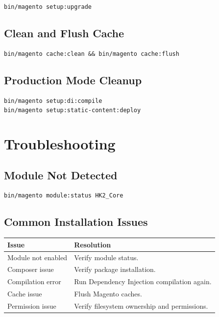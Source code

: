 \documentclass[11pt,a4paper]{article}
\begin{document}
\begin{lstlisting}[style=shell]
bin/magento setup:upgrade
\end{lstlisting}

\subsection{Clean and Flush Cache}

\begin{lstlisting}[style=shell]
bin/magento cache:clean && bin/magento cache:flush
\end{lstlisting}

\subsection{Production Mode Cleanup}

\begin{lstlisting}[style=shell]
bin/magento setup:di:compile
bin/magento setup:static-content:deploy
\end{lstlisting}

\section{Troubleshooting}

\subsection{Module Not Detected}

\begin{lstlisting}[style=shell]
bin/magento module:status HK2_Core
\end{lstlisting}

\subsection{Common Installation Issues}

\begin{longtable}{ll}
\toprule
\textbf{Issue} & \textbf{Resolution} \\
\midrule
\endhead
Module not enabled & Verify module status. \\
Composer issue & Verify package installation. \\
Compilation error & Run Dependency Injection compilation again. \\
Cache issue & Flush Magento caches. \\
Permission issue & Verify filesystem ownership and permissions. \\
\bottomrule
\end{longtable}
\end{document}
